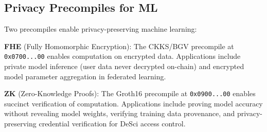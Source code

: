 \subsection{Privacy Precompiles for ML}

Two precompiles enable privacy-preserving machine learning:

\textbf{FHE} (Fully Homomorphic Encryption): The CKKS/BGV precompile at \texttt{0x0700...00} enables computation on encrypted data. Applications include private model inference (user data never decrypted on-chain) and encrypted model parameter aggregation in federated learning.

\textbf{ZK} (Zero-Knowledge Proofs): The Groth16 precompile at \texttt{0x0900...00} enables succinct verification of computation. Applications include proving model accuracy without revealing model weights, verifying training data provenance, and privacy-preserving credential verification for DeSci access control.

